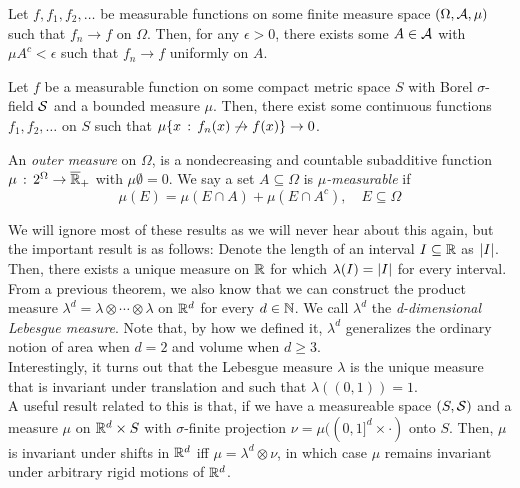 \begin{theorem}
    Let $f, f_1, f_2, \ldots$ be measurable functions on some finite measure space $(\Omega, \cal{A}, \mu)$ such that $f_n \to f$ on $\Omega$. Then, for any $\epsilon > 0$, there exists some $A \in \cal{A}$ with $\mu A^{c} < \epsilon$ such that $f_n \to f$ uniformly on $A$. 
\end{theorem}

\begin{theorem}
    Let $f$ be a measurable function on some compact metric space $S$ with Borel $\sigma$-field $\cal{S}$ and a bounded measure $\mu$. Then, there exist some continuous functions $f_1, f_2, \ldots$ on $S$ such that $\mu\{x \col f_{n}(x) \not \to f(x)\} \to 0$. 
\end{theorem}

\begin{definition}
    An \emph{outer measure} on $\Omega$, is a nondecreasing and countable subadditive function $\mu \col 2^{\Omega} \to \overline{\R}_{+}$ with $\mu \emptyset = 0$. We say a set $A \subseteq \Omega$ is \emph{$\mu$-measurable} if
    \[ \mu(E) = \mu(E \cap A) + \mu(E \cap A^{c}),\quad E \subseteq \Omega \]
\end{definition}

We will ignore most of these results as we will never hear about this again, but the important result is as follows: Denote the length of an interval $I \subseteq \R$ as $\abs{I}$. Then, there exists a unique measure on $\R$ for which $\lambda(I) = \abs{I}$ for every interval.\\

From a previous theorem, we also know that we can construct the product measure $\lambda^{d} = \lambda \otimes \cdots \otimes \lambda$ on $\R^{d}$ for every $d \in \N$. We call $\lambda^{d}$ the \emph{d-dimensional Lebesgue measure}. Note that, by how we defined it, $\lambda^{d}$ generalizes the ordinary notion of area when $d = 2$ and volume when $d \geq 3$.\\

Interestingly, it turns out that the Lebesgue measure $\lambda$ is the unique measure that is invariant under translation and such that $\lambda((0, 1)) = 1$.\\

A useful result related to this is that, if we have a measureable space $(S, \cal{S})$ and a measure $\mu$ on $\R^{d} \times S$ with $\sigma$-finite projection $\nu = \mu((0, 1]^{d} \times \cdot)$ onto $S$. Then, $\mu$ is invariant under shifts in $\R^{d}$ iff $\mu = \lambda^{d} \otimes \nu$, in which case $\mu$ remains invariant under arbitrary rigid motions of $\R^{d}$.\\
